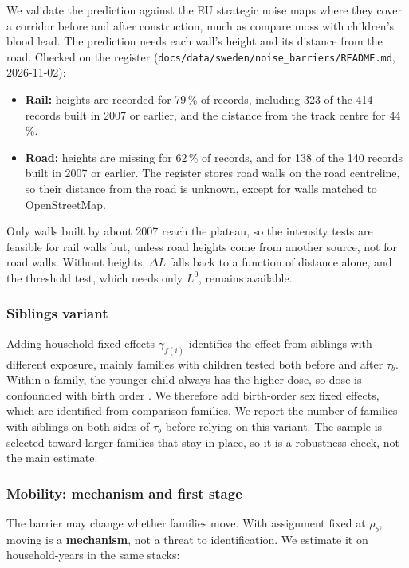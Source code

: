 \documentclass[11pt]{article}
\begin{document}
We validate the prediction against the EU strategic noise maps where they cover a corridor before and after construction, much as \textcite{gronqvistUnderstandingHowLow2020} compare moss with children's blood lead. The prediction needs each wall's height and its distance from the road. Checked on the register (\texttt{docs/data/sweden/noise\_barriers/README.md}, 2026-11-02):
\begin{itemize}
\item \textbf{Rail:} heights are recorded for 79\,\% of records, including 323 of the 414 records built in 2007 or earlier, and the distance from the track centre for 44\,\%.
\item \textbf{Road:} heights are missing for 62\,\% of records, and for 138 of the 140 records built in 2007 or earlier. The register stores road walls on the road centreline, so their distance from the road is unknown, except for walls matched to OpenStreetMap.
\end{itemize}
Only walls built by about 2007 reach the plateau, so the intensity tests are feasible for rail walls but, unless road heights come from another source, not for road walls. Without heights, \(\Delta L\) falls back to a function of distance alone, and the threshold test, which needs only \(L^0\), remains available.

\subsubsection{Siblings variant}

Adding household fixed effects \(\gamma_{f(i)}\) identifies the effect from siblings with different exposure, mainly families with children tested both before and after \(\tau_b\). Within a family, the younger child always has the higher dose, so dose is confounded with birth order \autocite{blackMoreMerrierEffect2005}. We therefore add birth-order \texttimes{} sex fixed effects, which are identified from comparison families. We report the number of families with siblings on both sides of \(\tau_b\) before relying on this variant. The sample is selected toward larger families that stay in place, so it is a robustness check, not the main estimate.

\subsubsection{Mobility: mechanism and first stage}

The barrier may change whether families move. With assignment fixed at \(\rho_b\), moving is a \textbf{mechanism}, not a threat to identification. We estimate it on household-years in the same stacks:
\end{document}
